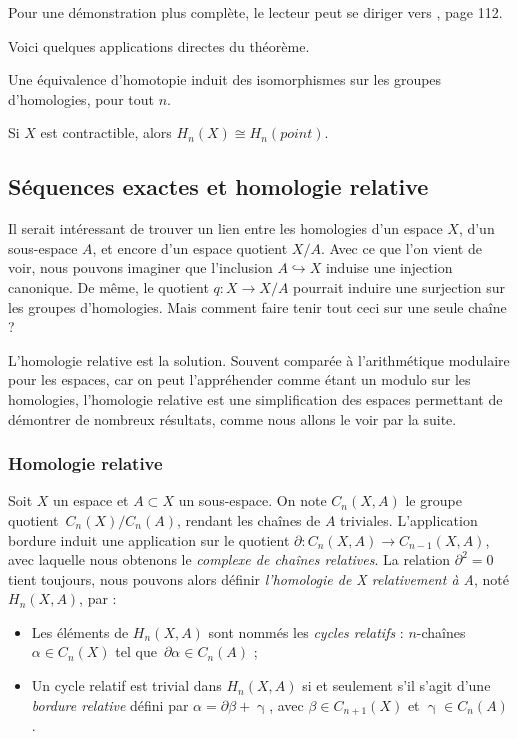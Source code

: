 Pour une démonstration plus complète, le lecteur peut se diriger vers \cite{Hatcher}, page 112.

Voici quelques applications directes du théorème.

\begin{corollary}
Une équivalence d'homotopie induit des isomorphismes sur les groupes d'homologies, pour tout $n$.
\end{corollary}
\begin{exemple}
Si $X$ est contractible, alors $H_n(X)\cong H_n(point)$.
\end{exemple}

\subsection{Séquences exactes et homologie relative}

Il serait intéressant de trouver un lien entre les homologies d'un espace $X$, d'un sous-espace $A$, et encore d'un espace quotient $X/A$. Avec ce que l'on vient de voir, nous pouvons imaginer que l'inclusion $A\hookrightarrow X$ induise une injection canonique. De même, le quotient $q:X\to X/A$ pourrait induire une surjection sur les groupes d'homologies. Mais comment faire tenir tout ceci sur une seule chaîne ?

L'homologie relative est la solution. Souvent comparée à l'arithmétique modulaire pour les espaces, car on peut l'appréhender comme étant un modulo sur les homologies, l'homologie relative est une simplification des espaces permettant de démontrer de nombreux résultats, comme nous allons le voir par la suite.

\subsubsection{Homologie relative}
\begin{definition}
Soit $X$ un espace et $A\subset X$ un sous-espace. On note $C_n(X,A)$ le groupe quotient~$C_n(X)/C_n(A)$, rendant les chaînes de $A$ triviales. L'application bordure induit une application sur le quotient $\partial:C_n(X,A)\to C_{n-1}(X,A)$, avec laquelle nous obtenons le \emph{complexe de chaînes relatives}. La relation $\partial^2=0$ tient toujours, nous pouvons alors définir \emph{l'homologie de X relativement à A}, noté $H_n(X,A)$, par : \begin{itemize}
    \item Les éléments de $H_n(X,A)$ sont nommés les \emph{cycles relatifs} : $n$-chaînes $\alpha\in C_n(X)$ tel que~${\partial\alpha\in C_n(A)}$ ;
    \item Un cycle relatif est trivial dans $H_n(X,A)$ si et seulement s'il s'agit d'une \emph{bordure relative} défini par $\alpha=\partial\beta+\upgamma$, avec $\beta\in C_{n+1}(X)$ et $\upgamma\in C_n(A)$.
\end{itemize}
\end{definition}

